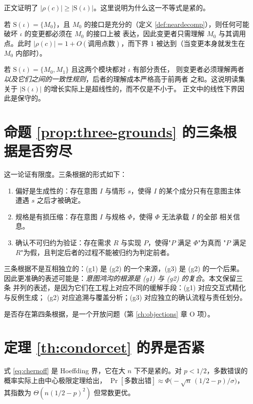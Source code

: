 正文证明了 $|\rho(c)| \ge |\mathrm{S}(\iota)|$。这里说明为什么这一不等式是紧的。

若 $\mathrm{S}(\iota) = \{M_0\}$，且 $M_0$ 的接口是充分的（定义
\ref{def:neardecomp}），则任何可能破坏 $\iota$ 的变更都必须在 $M_0$ 的接口上被
表达，因此变更者只需理解 $M_0$ 与其调用点。此时
$|\rho(c)| = 1 + O(\text{调用点数})$，而下界 $1$ 被达到（当变更本身就发生在 $M_0$
内部时）。

若 $\mathrm{S}(\iota) = \{M_0, M_1\}$ 且这两个模块都对 $\iota$ 有部分责任，
则变更者必须理解两者\emph{以及它们之间的一致性规则}，后者的理解成本严格高于前两者
之和。这说明读集关于 $|\mathrm{S}(\iota)|$ 的增长实际上是超线性的，而不仅是不小于。
正文中的线性下界因此是保守的。

\section{命题 \ref{prop:three-grounds} 的三条根据是否穷尽}

这一论证有限度。三条根据的形式如下：

\begin{enumerate}[label=(g\arabic*)]
\item 偏好是生成性的：存在意图 $I$ 与情形 $s$，使得 $I$ 的某个成分只有在意图主体
      遭遇 $s$ 之后才被确定。
\item 规格是有损压缩：存在意图 $I$ 与规格 $\Phi$，使得 $\Phi$ 无法承载 $I$ 的全部
      相关信息。
\item 确认不可归约为验证：存在需求 $R$ 与实现 $P$，使得"$P$ 满足 $\Phi$"为真而
      "$P$ 满足 $R$"为假，且判定后者的过程不能被归约为判定前者。
\end{enumerate}

三条根据不是互相独立的：(g1) 是 (g2) 的一个来源，(g3) 是 (g2) 的一个后果。
因此更准确的表述可能是：\emph{意图鸿沟的根源是 (g1) 与 (g2) 的复合}。本文保留三条
并列的表述，是因为它们在工程上对应不同的缓解手段：(g1) 对应交互式精化与反例生成；
(g2) 对应追溯与覆盖分析；(g3) 对应独立的确认流程与责任划分。

是否存在第四条根据，是一个开放问题（第 \ref{ch:objections} 章 O 项）。

\section{定理 \ref{th:condorcet} 的界是否紧}

式 \eqref{eq:chernoff} 是 Hoeffding 界，它在大 $n$ 下不是紧的。对
$p < 1/2$，多数错误的概率实际上由中心极限定理给出，
$\Pr[\text{多数出错}] \approx \Phi\bigl(-\sqrt{n}\,(1/2-p)/\sigma\bigr)$，
其指数为 $\Theta(n (1/2-p)^{2})$ 但常数更优。

